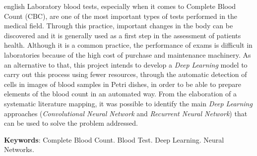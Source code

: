 \documentclass[
	10pt,				%
	oneside,
	a4paper,			%
	chapter=TITLE,		%
	english,			%
	brazil				%
	]{abntex2}
\begin{document}
\begin{resumo}[Abstract]
 \begin{otherlanguage*}{english}
		Laboratory blood tests, especially when it comes to Complete Blood Count (CBC), are one of the most important types of tests performed in the medical field. Through this practice, important changes in the body can be discovered and it is generally used as a first step in the assessment of patients health. Although it is a common practice, the performance of exams is difficult in laboratories because of the high cost of purchase and maintenance machinery. As an alternative to that, this project intends to develop a \emph{Deep Learning} model to carry out this process using fewer resources, through the automatic detection of cells in images of blood samples in Petri dishes, in order to be able to prepare elements of the blood count in an automated way. From the elaboration of a systematic literature mapping, it was possible to identify the main \emph{Deep Learning} approaches (\emph{Convolutional Neural Network} and \emph{Recurrent Neural Network}) that can be used to solve the problem addressed.
		\vspace{\onelineskip}
		\noindent 
						
		\textbf{Keywords}: Complete Blood Count. Blood Test. Deep Learning. Neural Networks.
	\end{otherlanguage*}
\end{resumo}


\listoffigures*
\cleardoublepage
\listoftables*
\cleardoublepage

\begin{KeepFromToc}
\lstlistoflistings
\end{KeepFromToc}
\cleardoublepage


\cleardoublepage





\tableofcontents*
\cleardoublepage
\end{document}
